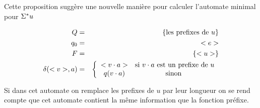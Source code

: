 Cette proposition suggère une nouvelle manière pour calculer l'automate minimal pour $\Sigma^{*} u$

\begin{eqnarray*}
	Q  &=& \left\{\text {les prefixes de } u\right\} \\
	q_0 &=& <e> \\
	F &=& \left\{<u>\right\} \\
	\delta(<v>,a) &=&  \left\{ \begin{array}{cc}
		<v \cdot a>  & \text{si } v\cdot a \text{ est un prefixe de } u \\
		q(v \cdot a) & \text{sinon }
	\end{array}\right.
\end{eqnarray*}



\begin{remarque}
	Si dans cet automate on remplace les prefixes de $u$ par leur longueur on se rend compte que cet automate
	contient la même information que la fonction préfixe.
\end{remarque}
